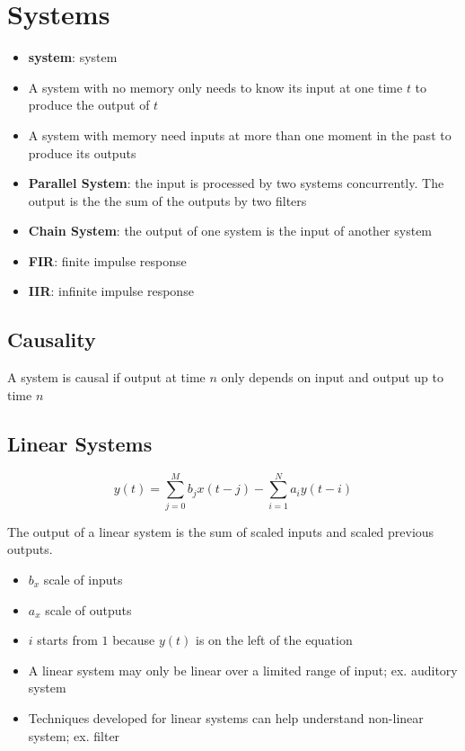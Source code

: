 \chapter{Systems}

\begin{itemize}
  \item \textbf{\Gls{system}}: \glsdesc{system}
  \item A system with no memory only needs to know its input at one time
  $ t $ to produce the output of $ t $
  \item A system with memory need inputs at more than one moment in the past
  to produce its outputs
  \item \textbf{Parallel System}: the input is processed by two systems
  concurrently. The output is the the sum of the outputs by two filters
  \item \textbf{Chain System}: the output of one system is the input
  of another system
  \item \textbf{FIR}: finite impulse response
  \item \textbf{IIR}: infinite impulse response
\end{itemize}

\section{Causality}

  A system is causal if output at time $ n $ only depends on input and output
  up to time $ n $

\section{Linear Systems}

  \begin{equation}
    y\left( t \right) =
      \sum_{j = 0}^{M} b_{j} x\left( t - j \right)
      - \sum_{i = 1}^{N} a_{i} y\left( t - i \right)
  \end{equation}

  The output of a linear system is the sum of scaled inputs and
  scaled previous outputs.

  \begin{itemize}
    \item $ b_{x} $ scale of inputs
    \item $ a_{x} $ scale of outputs
    \item $ i $ starts from $ 1 $ because $ y\left( t \right) $ is on the left
    of the equation
    \item A linear system may only be linear over a limited range of input;
    ex. auditory system
    \item Techniques developed for linear systems can help understand
    non-linear system; ex. filter
  \end{itemize}

